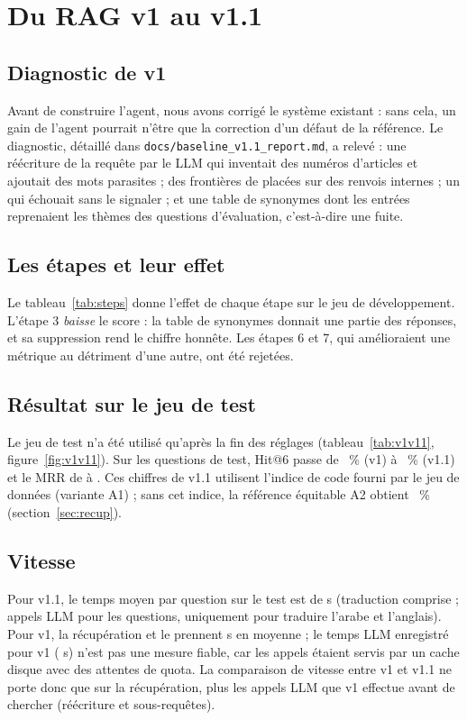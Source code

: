 \section{Du RAG v1 au v1.1}\label{sec:v11}

\subsection{Diagnostic de v1}
Avant de construire l'agent, nous avons corrigé le système existant : sans cela, un gain de l'agent pourrait n'être
que la correction d'un défaut de la référence. Le diagnostic, détaillé dans \texttt{docs/baseline\_v1.1\_report.md}, a
relevé : une réécriture de la requête par le LLM qui inventait des numéros d'articles et ajoutait des mots parasites ;
des frontières de  placées sur des renvois internes ; un  qui échouait sans le signaler ; et une
table de synonymes dont les entrées reprenaient les thèmes des questions d'évaluation, c'est-à-dire une fuite.

\subsection{Les étapes et leur effet}
Le tableau~\ref{tab:steps} donne l'effet de chaque étape sur le jeu de développement. L'étape 3 \emph{baisse} le score :
la table de synonymes donnait une partie des réponses, et sa suppression rend le chiffre honnête. Les étapes 6 et 7,
qui amélioraient une métrique au détriment d'une autre, ont été rejetées.



\subsection{Résultat sur le jeu de test}
Le jeu de test n'a été utilisé qu'après la fin des réglages (tableau~\ref{tab:v1v11}, figure~\ref{fig:v1v11}).
Sur les \NVoneTestN{} questions de test, Hit@6 passe de \NVoneTestHitsix~\% (v1) à \NVoneoneTestHitsix~\% (v1.1) et le MRR
de \NVoneTestMrr{} à \NVoneoneTestMrr. Ces chiffres de v1.1 utilisent l'indice de code fourni par le jeu de données
(variante A1) ; sans cet indice, la référence équitable A2 obtient \NPvrTestATwoHitsix~\% (section~\ref{sec:recup}).



\subsection{Vitesse}
Pour v1.1, le temps moyen par question sur le test est de \NVoneoneSecTotal{} s (traduction comprise ;
\NVoneoneTestLlmcalls{} appels LLM pour les \NQTest{} questions, uniquement pour traduire l'arabe et l'anglais). Pour v1, la
récupération et le  prennent \NVoneSecRetrieval{} s en moyenne ; le temps LLM enregistré pour v1
(\NVoneSecLlm{} s) n'est pas une mesure fiable, car les appels étaient servis par un cache disque avec des attentes de quota.
La comparaison de vitesse entre v1 et v1.1 ne porte donc que sur la récupération, plus les appels LLM que v1 effectue
avant de chercher (réécriture et sous-requêtes).
